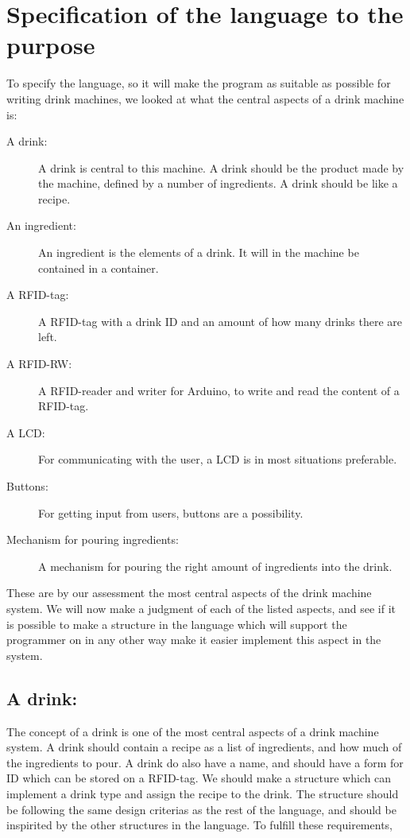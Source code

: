 \section{Specification of the language to the purpose}
To specify the language, so it will make the program as suitable as possible for writing drink machines, we looked at what the central aspects of a drink machine is:
\begin{description}
\item[A drink:] A drink is central to this machine. A drink should be the product made by the machine, defined by a number of ingredients. A drink should be like a recipe.
\item[An ingredient:] An ingredient is the elements of a drink. It will in the machine be contained in a container. 
\item[A RFID-tag:] A RFID-tag with a drink ID and an amount of how many drinks there are left.
\item[A RFID-RW:] A RFID-reader and writer for Arduino, to write and read the content of a RFID-tag.
\item[A LCD:] For communicating with the user, a LCD is in most situations preferable.
\item[Buttons:] For getting input from users, buttons are a possibility. 
\item[Mechanism for pouring ingredients:] A mechanism for pouring the right amount of ingredients into the drink.
\end{description}
These are by our assessment the most central aspects of the drink machine system. We will now make a judgment of each of the listed aspects, and see if it is possible to make a structure in the language which will support the programmer on in any other way make it easier implement this aspect in the system.
\subsection{A drink:}
The concept of a drink is one of the most central aspects of a drink machine system. A drink should contain a recipe as a list of ingredients, and how much of the ingredients to pour. A drink do also have a name, and should have a form for ID which can be stored on a RFID-tag. We should make a structure which can implement a drink type and assign the recipe to the drink. The structure should be following the same design criterias as the rest of the language, and should be inspirited by the other structures in the language. To fulfill these requirements, 